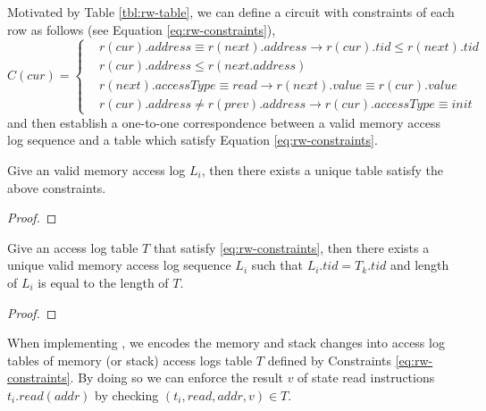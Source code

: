 \noindent Motivated by Table \ref{tbl:rw-table}, we can define a circuit with constraints of each row as follows (see Equation \ref{eq:rw-constraints}),
\begin{equation}
\label{eq:rw-constraints}
C(cur) = \begin{cases}
    &r(cur).address \equiv r(next).address \rightarrow r(cur).tid \le r(next).tid \\
    &r(cur).address  \le r(next.address) \\
    &r(next).accessType \equiv read \rightarrow r(next).value \equiv r(cur).value \\
    &r(cur).address \neq r(prev).address \rightarrow r(cur).accessType \equiv init
\end{cases}
\end{equation}
and then establish a one-to-one correspondence between a valid memory access log sequence and a table which satisfy Equation \ref{eq:rw-constraints}.
\begin{theorem}
\label{thm:one-one-rw-1}
Give an valid memory access log ${L_i}$, then there exists a unique table satisfy the above constraints.
\end{theorem}
\begin{proof}
\end{proof}
\begin{theorem}
\label{thm:one-one-rw-2}
Give an access log table $T$ that satisfy \ref{eq:rw-constraints}, then there exists a unique valid memory access log sequence $L_i$ such that $L_i.tid = T_k.tid$ and length of $L_i$ is equal to the length of $T$.
\end{theorem}
\begin{proof}
\end{proof}
When implementing \zkwasm, we encodes the memory and stack changes into access log tables of memory (or stack) access logs table $T$ defined by Constraints \ref{eq:rw-constraints}. By doing so we can enforce the result $v$ of state read instructions $t_i.read(addr)$ by checking $(t_i, read, addr, v) \in T$.
